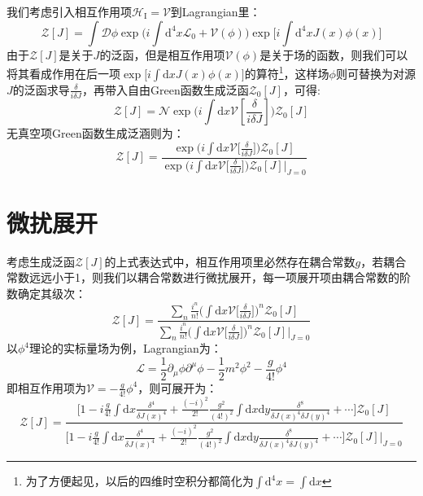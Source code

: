我们考虑引入相互作用项$\mathscr{H}_{\text{I}}=\mathscr{V}$到Lagrangian里：
\begin{equation}
\mathcal{Z}[J]={\int\mathcal{D}\phi \exp\Big(i\int\mathrm{d}^4x\mathscr{L}_0+\mathscr{V}(\phi)\Big)\exp{\Big[i\int\mathrm{d}^4x J(x)\phi(x)\Big]}}
\end{equation}
由于$\mathscr{Z}[J]$是关于$J$的泛函，但是相互作用项$\mathscr{V}(\phi)$是关于场的函数，则我们可以将其看成作用在后一项$\exp\Big[i\int\mathrm{d}x J(x)\phi(x)\Big]$的算符\footnote{为了方便起见，以后的四维时空积分都简化为$\int\mathrm{d}^4 x =\int\mathrm{d}x$}，这样场$\phi$则可替换为对源$J$的泛函求导$\frac{\delta}{i\delta J}$，再带入自由Green函数生成泛函$\mathcal{Z}_0[J]$，可得:
\begin{equation}
\mathcal{Z}[J]=\mathcal{N}\exp\Big(i\int\mathrm{d}x\mathscr{V}\left[\frac{\delta}{i\delta J}\right]\Big)\mathcal{Z}_0[J]
\end{equation}
无真空项Green函数生成泛涵则为：
\begin{equation}
\mathscr{Z}[J]=\frac{\displaystyle{\exp\Big(i\int\mathrm{d}x\mathscr{V}\Big[\frac{\delta}{i\delta J}\Big]\Big)\mathcal{Z}_0[J]}}{\displaystyle{\exp\Big(i\int\mathrm{d}x\mathscr{V}\Big[\frac{\delta}{i\delta J}\Big]\Big)\mathcal{Z}_0[J]\Big|_{J=0}}}
\end{equation}
\section{微扰展开}
考虑生成泛函$\mathscr{Z}[J]$的上式表达式中，相互作用项里必然存在耦合常数$g$，若耦合常数远远小于1，则我们以耦合常数进行微扰展开，每一项展开项由耦合常数的阶数确定其级次：
\begin{equation}
\mathscr{Z}[J]=\frac{\displaystyle{\sum_{n}\frac{i^n}{n!}\Big(\int\mathrm{d}x\mathscr{V}\Big[\frac{\delta}{i\delta J}\Big]\Big)^n\mathcal{Z}_0[J]}}{\displaystyle{\sum_{n}\frac{i^n}{n!}\Big(\int\mathrm{d}x\mathscr{V}\Big[\frac{\delta}{i\delta J}\Big]\Big)^n\mathcal{Z}_0[J]\Big|_{J=0}}}
\end{equation}
以$\phi^4$理论的实标量场为例，Lagrangian为：
\begin{equation}
\mathscr{L}=\frac{1}{2}\partial_\mu\phi\partial^\mu\phi-\frac{1}{2}m^2\phi^2-\frac{g}{4!}\phi^4
\end{equation}
即相互作用项为$\mathscr{V}=-\frac{g}{4!}\phi^4$，则可展开为：
	\begin{equation}
	\mathscr{Z}[J]=\frac{\displaystyle{\Big[1-i\frac{g}{4!}\int\mathrm{d}x\frac{\delta^4}{\delta J(x)^4}+\frac{(-i)^2}{2!}\frac{g^2}{(4!)^2}\int\mathrm{d}x\mathrm{d}y\frac{\delta^8}{\delta J(x)^4 \delta J(y)^4}+\cdots\Big]\mathcal{Z}_0[J]}}{\displaystyle{\Big[1-i\frac{g}{4!}\int\mathrm{d}x\frac{\delta^4}{\delta J(x)^4}+\frac{(-i)^2}{2!}\frac{g^2}{(4!)^2}\int\mathrm{d}x\mathrm{d}y\frac{\delta^8}{\delta J(x)^4 \delta J(y)^4}+\cdots\Big]\mathcal{Z}_0[J]\Big|_{J=0}}}
	\end{equation}

